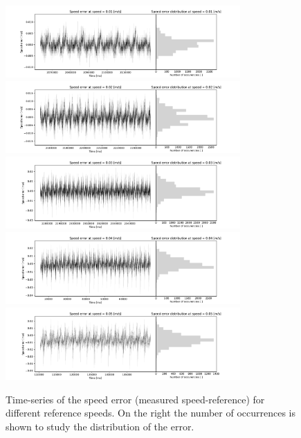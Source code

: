 \documentclass[12pt,a4paper, twoside]{article}
\begin{document}
\begin{figure}[htp]
	\centering
	\includegraphics[width=0.8\textwidth]{fig/speed_error_0}\\
	\includegraphics[width=0.8\textwidth]{fig/speed_error_1}\\
	\includegraphics[width=0.8\textwidth]{fig/speed_error_2}\\
	\includegraphics[width=0.8\textwidth]{fig/speed_error_3}\\
	\includegraphics[width=0.8\textwidth]{fig/speed_error_4}
	\caption[Speed error time-series]{Time-series of the speed error (measured speed-reference) for different reference speeds. On the right the number of occurrences is shown to study the distribution of the error.}\label{fig:speed_error}
\end{figure}
	
\end{document}
